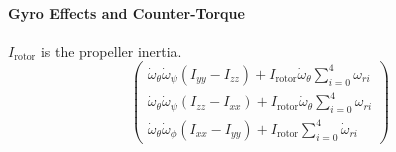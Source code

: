    \paragraph{Gyro Effects and Counter-Torque}
        $I_{\text{rotor}}$ is the propeller inertia.
        \begin{equation}\left(
            \begin{array}{c}
                \dot{\omega}_{\theta}\dot{\omega}_{\psi}(I_{yy}-I_{zz}) + I_{\text{rotor}}\dot{\omega}_{\theta}\sum_{i=0}^{4}\omega_{ri} \\
                \dot{\omega}_{\theta}\dot{\omega}_{\psi}(I_{zz}-I_{xx}) + I_{\text{rotor}}\dot{\omega}_{\theta}\sum_{i=0}^{4}\omega_{ri} \\
                \dot{\omega}_{\theta}\dot{\omega}_{\phi}(I_{xx}-I_{yy}) + I_{\text{rotor}}\sum_{i=0}^{4}\dot{\omega}_{ri}
            \end{array}\right)
        \end{equation}
